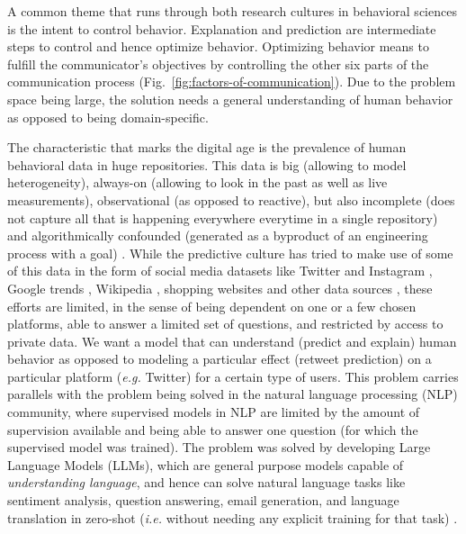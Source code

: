 \documentclass[hidelinks,11pt,a4paper]{report}
\renewcommand{\cite}[1]{\citep{#1}}
\begin{document}
A common theme that runs through both research cultures in behavioral sciences is the intent to control behavior. Explanation and prediction are intermediate steps to control and hence optimize behavior. Optimizing behavior means to fulfill the communicator's objectives by controlling the other six parts of the communication process (Fig.~\ref{fig:factors-of-communication}). Due to the problem space being large, the solution needs a general understanding of human behavior as opposed to being domain-specific. 


The characteristic that marks the digital age is the prevalence of human behavioral data in huge repositories. This data is big (allowing to model heterogeneity), always-on (allowing to look in the past as well as live measurements), observational (as opposed to reactive), but also incomplete (does not capture all that is happening everywhere everytime in a single repository) and algorithmically confounded (generated as a byproduct of an engineering process with a goal) \cite{salganik2019bit}. While the predictive culture has tried to make use of some of this data in the form of social media datasets like Twitter \cite{tumasjan2010predicting,asur2010predicting} and Instagram \cite{XXX}, Google trends \cite{choi2012predicting,carriere2013nowcasting}, Wikipedia \cite{generous2014global,de2021general,mestyan2013early}, shopping websites \cite{krumme2013predictability,de2015unique} and other data sources \cite{brockmann2006scaling,song2010limits,miritello2013limited}, these efforts are limited, in the sense of being dependent on one or a few chosen platforms, able to answer a limited set of questions, and restricted by access to private data. We want a model that can understand (predict and explain) human behavior as opposed to modeling a particular effect (retweet prediction) on a particular platform (\textit{e.g.} Twitter) for a certain type of users.
This problem carries parallels with the problem being solved in the natural language processing (NLP) community, where supervised models in NLP are limited by the amount of supervision available and being able to answer one question (for which the supervised model was trained). The problem was solved by developing Large Language Models (LLMs), which are general purpose models capable of \textit{understanding language}, and hence can solve natural language tasks like sentiment analysis, question answering, email generation, and language translation in zero-shot (\textit{i.e.} without needing any explicit training for that task) \cite{XXX}.
\end{document}
